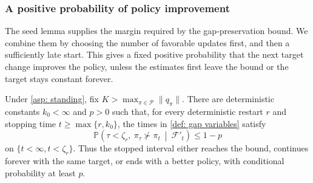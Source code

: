 \subsubsection{A positive probability of policy improvement}
The seed lemma supplies the margin required by the gap-preservation bound. We combine them by choosing the number of favorable updates first, and then a sufficiently late start. This gives a fixed positive probability that the next target change improves the policy, unless the estimates first leave the bound or the target stays constant forever.

\begin{lemma}
\label{thm: fixed prob that bad actions dont become greedy}
Under \autoref{asp: standing}, fix $K>\max_{\pi\in\mathcal P}\|q_\pi\|$. There are deterministic constants $k_0<\infty$ and $p>0$ such that, for every deterministic restart $r$ and stopping time $t\ge\max\{r,k_0\}$, the times in \autoref{def: gap variables} satisfy
\begin{equation}
\label{eq:progress}
\mathbb P\!\left(\tau<\zeta_r,\ \pi_\tau\not\succ\pi_t
\ \middle|\ \mathcal F'_t\right)\le1-p
\end{equation}
on $\{t<\infty,t<\zeta_r\}$. Thus the stopped interval either reaches the bound, continues forever with the same target, or ends with a better policy, with conditional probability at least $p$.
\end{lemma}
